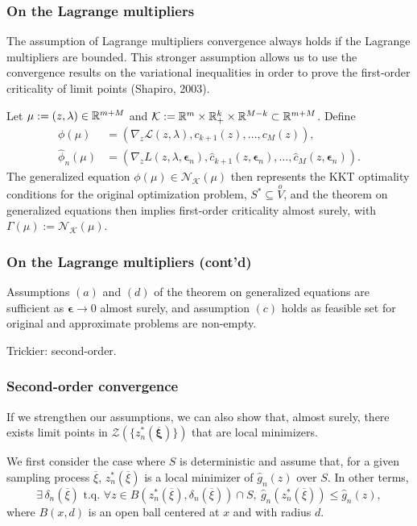\documentclass{beamer}
\def\bxi{\boldsymbol\xi}
\def\bepsilon{\boldsymbol\epsilon}
\begin{document}
\begin{frame}
\frametitle{On the Lagrange multipliers}

The assumption of Lagrange multipliers convergence always holds if the Lagrange multipliers are bounded.
This stronger assumption allows us to use the convergence results on the variational inequalities in order to prove the first-order criticality of limit points (Shapiro, 2003).

\mbox{}

Let $\mu := (z,\lambda) \in \mathbb{R}^{m+M}$ and $\mathcal{K} := \mathbb{R}^m
\times \mathbb{R}^k_+ \times \mathbb{R}^{M-k} \subset \mathbb{R}^{m+M}$.
Define
\begin{align*}
\phi(\mu) &= \left( \nabla_z \mathcal{L}(z, \lambda), c_{k+1}(z),
\ldots, c_M(z) \right),\\
\hat{\phi}_n(\mu) &= \left( \nabla_z L(z, \lambda, \bepsilon_n),
\hat{c}_{k+1}(z, \bepsilon_n), \ldots, \hat{c}_{M}(z,
\bepsilon_n)\right).
\end{align*}
The generalized equation $\phi(\mu) \in \mathcal{N}_{\mathcal{K}}(\mu)$ then represents the KKT optimality conditions for the original optimization problem, $S^* \subseteq \overset{o}{V}$, and the theorem on generalized equations then implies first-order criticality almost surely, with $\Gamma(\mu) := \mathcal{N}_{\mathcal{K}}(\mu)$.

\end{frame}

\begin{frame}
\frametitle{On the Lagrange multipliers (cont'd)}

Assumptions $(a)$ and $(d)$ of the theorem on generalized equations are sufficient as $\bepsilon \rightarrow 0$ almost surely, and assumption $(c)$ holds as feasible set for original and approximate problems are non-empty.

\mbox{}

Trickier: second-order.

\end{frame}

\begin{frame}
\frametitle{Second-order convergence}

If we strengthen our assumptions, we can also show that, almost surely, there exists limit points in $\mathcal{Z}\left(\lbrace z^*_n(\overline{\bxi})\rbrace\right)$ that are local minimizers.

\mbox{}

We first consider the case where $S$ is deterministic and assume that, for a given sampling process $\overline{\xi}$, $z_n^*(\overline{\xi})$ is a local minimizer of $\hat{g}_n(z)$ over $S$.
In other terms,
\[
\exists\, \delta_n(\overline{\xi}) \text{ t.q. } \forall z \in
B \left( z_n^*(\overline{\xi}), \delta_n(\overline{\xi}) \right) \cap
S,\ \hat{g}_n \left( z_n^*(\overline{\xi}) \right) \leq \hat{g}_n(z),
\]
where $B(x,d)$ is an open ball centered at $x$ and with radius $d$.

\end{frame}
\end{document}
